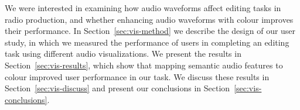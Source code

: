 
We were interested in examining how audio waveforms affect editing tasks in radio production, and whether enhancing
audio waveforms with colour improves their performance. In Section~\ref{sec:vis-method} we describe the design of our
user study, in which we measured the performance of users in completing an editing task using different audio
visualizations. We present the results in Section~\ref{sec:vis-results}, which show that mapping semantic audio
features to colour improved user performance in our task. We discuss these results in Section~\ref{sec:vis-discuss} and
present our conclusions in Section~\ref{sec:vis-conclusions}.






